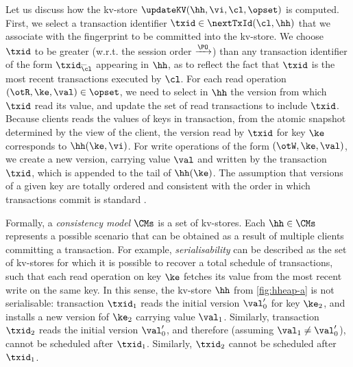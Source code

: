 Let us discuss how the kv-store $\updateKV(\hh, \vi, \cl, \opset)$ is computed. 
First, we select a transaction identifier $\txid \in \nextTxId(\cl, \hh)$ that we associate 
with the fingerprint to be committed into the kv-store. We choose $\txid$ to be 
greater (w.r.t. the session order $\xrightarrow{\PO}$) than any transaction identifier 
of the form $\txid_{\cl}^{\_}$ appearing in $\hh$, as to reflect the fact that 
$\txid$ is the most recent transactions executed by $\cl$.
For each read operation $(\otR, \ke, \val) \in \opset$, we need to select in $\hh$ the version 
from which $\txid$ read its value, and update the set of read transactions to include $\txid$. 
Because clients reads the values of keys in transaction, from the atomic 
snapshot determined by the view of the client, the version read by $\txid$ for key $\ke$ 
corresponds to $\hh(\ke, \vi)$. For write operations of the form $(\otW, \ke, \val)$, 
we create a new version, carrying value $\val$ and written by the transaction $\txid$, 
which is appended to the tail of $\hh(\ke)$. The assumption that versions of 
a given key are totally ordered and consistent with the order in which 
transactions commit is standard \cite{adya,framework-concur,seebelieve}. 

Formally, a \emph{consistency model} $\CMs$ is a 
set of kv-stores. Each $\hh \in \CMs$ represents a possible scenario that 
can be obtained as a result of multiple clients committing a transaction. 
For example, \emph{serialisability} can be described as the set 
of kv-stores for which it is possible to recover a total schedule of transactions, 
such that each read operation on key $\ke$ fetches its value from the 
most recent write on the same key.
In this sense, the kv-store $\hh$ from \cref{fig:hheap-a} is not serialisable: 
transaction $\txid_1$ reads the initial version $\val'_0$ for key $\ke_{2}$, 
and installs a new version fof $\ke_{2}$ carrying value $\val_1$. Similarly, transaction $\txid_2$ 
reads the initial version $\val'_0$, and therefore (assuming $\val_1 \neq \val'_0$), 
cannot be scheduled after $\txid_1$. Similarly, $\txid_2$ cannot be scheduled after $\txid_1$.

